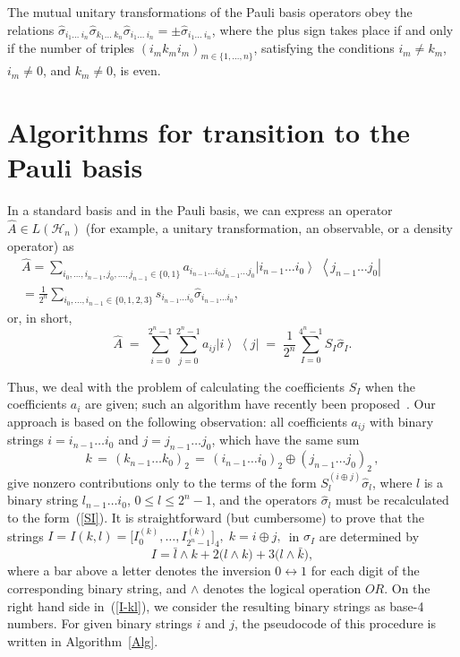 \documentclass[12pt,a4paper,twoside]{article}      %
\newcommand{\ketbra}[2]{{\ensuremath {\left|#1\right\rangle\!\;\!\!\left\langle#2\right|}}}
\begin{document}
{\proposition
The mutual unitary transformations of the Pauli basis operators obey the relations $\hat{\sigma}_{i_1\ldots\:\!i_n} \hat{\sigma}_{k_1\ldots\:\!k_n} \hat{\sigma}_{i_1\ldots\:\!i_n}=\pm \hat{\sigma}_{i_1\ldots\:\!i_n}$, where the plus sign takes place if and only if the number of triples $(i_mk_mi_m)_{m\in\{1,\ldots,n\}}$, satisfying the conditions $i_m\neq{}k_m$, $i_m\neq{}0$, and $k_m\neq0$, is even.}\label{p2}




\section{Algorithms for transition to the Pauli basis}
\label{sec5}

In a standard basis and in the Pauli basis, we can express an operator $\hat{A}\in L(\mathcal{H}_n)$ (for example, a unitary transformation, an observable, or a density operator) as
\begin{multline}\label{}
\hat{A}=
\sum\limits_{i_0,\ldots,i_{n-1}, j_0,\ldots,j_{n-1}\in\{0,1\}}  a_{i_{n-1}\ldots{}i_0j_{n-1}\ldots{}j_0} \ketbra{i_{n-1}\!\ldots{}i_0}{j_{n-1}\!\ldots{}j_0}
\qquad\qquad\quad\\
=\frac{1}{2^n} \sum\limits_{i_0,\ldots,i_{n-1}\in\{0,1,2,3\}} s_{i_{n-1}\ldots{}i_0} \hat{\sigma}_{i_{n-1}\ldots{}i_0},
\nonumber
\end{multline}
or, in short,
\begin{equation}\label{SI}
\hat{A}\;=\;
\sum\limits_{i=0}^{2^n-1}\sum\limits_{j=0}^{2^n-1}  a_{ij}\ketbra{i}{j}\;=\;
\frac{1}{2^n} \sum\limits_{I=0}^{4^n-1} S_{I} \hat{\sigma}_{I}.
\end{equation}

Thus, we deal with the problem of calculating the coefficients $S_I$ when the coefficients $a_i$ are given; such an algorithm have recently been proposed~\cite{Gunlycke2020}. Our approach is based on the following observation: all coefficients $a_{ij}$ with binary strings $i=i_{n-1}\ldots{}i_0$ and $j=j_{n-1}\ldots{}j_0$, which have the same sum
\begin{equation}\label{}
k\,=\,(k_{n-1}\ldots{}k_0)_2\,= \, (i_{n-1}\ldots{}i_0)_2 \oplus(j_{n-1}\ldots{}j_0)_2\,, \nonumber
\end{equation}
give nonzero contributions only to the terms of the form $S^{(i\oplus{}j)}_{l} \hat{\sigma}_{l}$, where $l$ is a binary string $l_{n-1}\ldots{}i_0$, $0 \leqslant l \leqslant 2^n-1$, and the operators $\hat{\sigma}_{l}$ must be recalculated to the form~(\ref{SI}). It is straightforward (but cumbersome) to prove that the strings $I=I(k,l)=\big[I^{(k)}_0,\ldots,I^{(k)}_{2^n-1}\big]_4, \;k=i\oplus{}j,\,$ in $\hat{\sigma}_{I}$ are determined by
\begin{equation}\label{I-kl}
I=\bar{l}\wedge{}k+ 2\big(l\wedge{}k\big)+ 3\big(l\wedge{}\bar{k}\big),
\end{equation}
where a bar above a letter denotes the inversion $0\leftrightarrow1$ for each digit of the corresponding binary string, and $\wedge$ denotes the logical operation $OR$. On the right hand side in~(\ref{I-kl}), we  consider the resulting binary strings as base-4 numbers. For given binary strings $i$ and $j$, the pseudocode of this procedure is written in Algorithm~\ref{Alg}.
\end{document}
